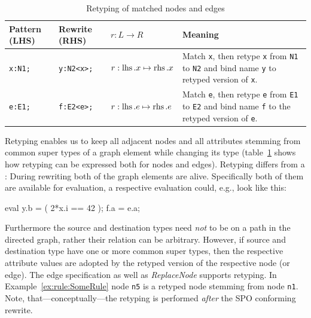 \begin{table}[htbp]
\centering
\begin{tabularx}{\linewidth}{lllX}
  \textbf{Pattern (LHS)} & \textbf{Rewrite (RHS)} & \textbf{$r: L \longrightarrow R$} & \textbf{Meaning} \\ \hline
  \texttt{x:N1;} & \texttt{y:N2<x>;}          & $r:\operatorname{lhs}.x \mapsto \operatorname{rhs}.x$ & Match \texttt{x}, then retype \texttt{x} from \texttt{N1} to \texttt{N2} and bind name \texttt{y} to retyped version of \texttt{x}.\\
  \texttt{e:E1;} & \texttt{f:E2<e>;}          & $r:\operatorname{lhs}.e \mapsto \operatorname{rhs}.e$ & Match \texttt{e}, then retype \texttt{e} from \texttt{E1} to \texttt{E2} and bind name \texttt{f} to the retyped version of \texttt{e}.\\
\end{tabularx}
\caption{Retyping of matched nodes and edges}
\label{rule:retyping_graphlets}
\end{table}

Retyping enables us to keep all adjacent nodes and all attributes stemming from common super types of a graph element while changing its type (table~\ref{rule:retyping_graphlets} shows how retyping can be expressed both for nodes and edges).
Retyping differs from a : During rewriting both of the graph elements are alive.
  Specifically both of them are available for evaluation, a respective evaluation could, e.g., look like this:
  \begin{grgenlet}
eval {
  y.b = ( 2*x.i == 42 );
  f.a = e.a;
}
  \end{grgenlet}
Furthermore the source and destination types need \emph{not} to be on a path in the directed  graph, rather their relation can be arbitrary.
However, if source and destination type have one or more common super types, then the respective attribute values are adopted by the retyped version of the respective node (or edge).
The edge specification as well as \emph{ReplaceNode} supports retyping.
In Example~\ref{ex:rule:SomeRule} node \texttt{n5} is a retyped node stemming from node \texttt{n1}.
Note, that---conceptually---the retyping is performed \emph{after} the SPO conforming rewrite.

